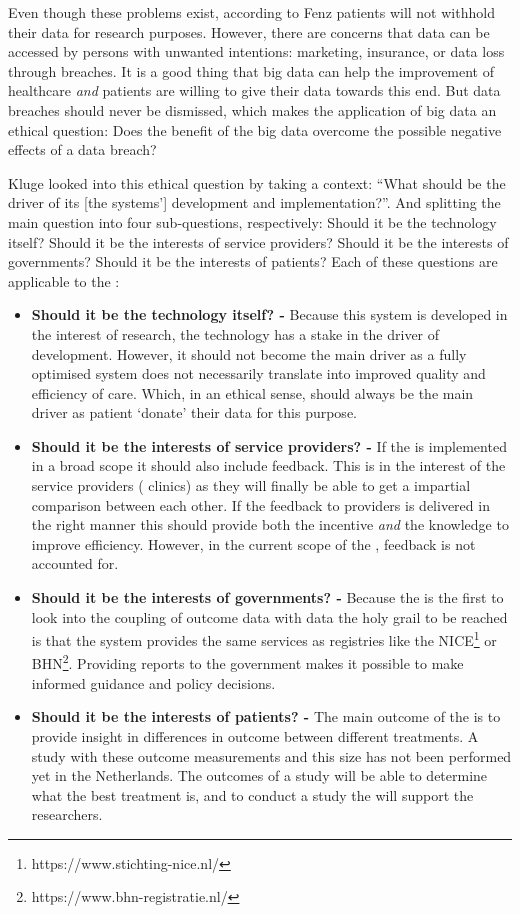 Even though these problems exist, according to Fenz \cite{s15Fenz2014} patients will not withhold their data for research purposes.
However, there are concerns that data can be accessed by persons with unwanted intentions: marketing, insurance, or data loss through breaches.
It is a good thing that big data can help the improvement of healthcare \emph{and} patients are willing to give their data towards this end.
But data breaches should never be dismissed, which makes the application of big data an ethical question: Does the benefit of the big data overcome the possible negative effects of a data breach?

Kluge \cite{s7Kluge2007} looked into this ethical question by taking a context: ``What should be the driver of its [the systems'] development and implementation?''. 
And splitting the main question into four sub-questions, respectively: Should it be the technology itself? Should it be the interests of service providers? Should it be the interests of governments? Should it be the interests of patients?
Each of these questions are applicable to the \project{}:

\begin{itemize}
	\item \textbf{Should it be the technology itself? -} Because this system is developed in the interest of research, the technology has a stake in the driver of development.
	However, it should not become the main driver as a fully optimised system does not necessarily translate into improved quality and efficiency of care.
	Which, in an ethical sense, should always be the main driver as patient `donate' their data for this purpose.
	\item \textbf{Should it be the interests of service providers? -} If the \ivfsystem{} is implemented in a broad scope it should also include feedback.
	This is in the interest of the service providers (\ie{} clinics) as they will finally be able to get a impartial comparison between each other.
	If the feedback to providers is delivered in the right manner this should provide both the incentive \emph{and} the knowledge to improve efficiency.
	However, in the current scope of the \project{}, feedback is not accounted for.
	\item \textbf{Should it be the interests of governments? -} Because the \project{} is the first to look into the coupling of outcome data with \IVF{} data the holy grail to be reached is that the system provides the same services as registries like the NICE\footnote{https://www.stichting-nice.nl/} or BHN\footnote{https://www.bhn-registratie.nl/}.
	Providing reports to the government makes it possible to make informed guidance and policy decisions.
	\item \textbf{Should it be the interests of patients? -} The main outcome of the \project{} is to provide insight in differences in outcome between different \IVF{} treatments.
	A study with these outcome measurements and this size has not been performed yet in the Netherlands.
	The outcomes of a study will be able to determine what the best treatment is, and to conduct a study the \ivfsystem{} will support the researchers.
\end{itemize}

